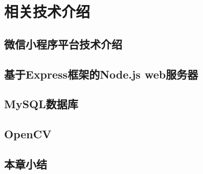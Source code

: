 
\chapter{相关技术介绍}
\section{微信小程序平台技术介绍}
\section{基于Express框架的Node.js web服务器}
\section{MySQL数据库}
\section{OpenCV}



\section{本章小结}









